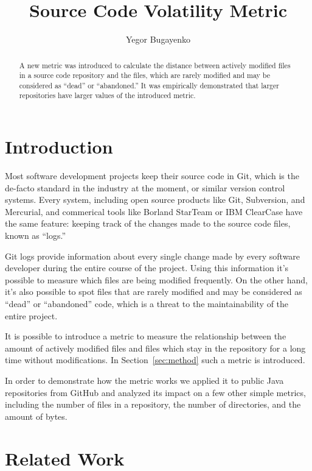 \documentclass[12pt]{article}
\title{Source Code Volatility Metric}
\author{Yegor Bugayenko}{}{}
\begin{document}
\raggedbottom
\maketitle

\begin{abstract}
A new metric was introduced to calculate the distance
between actively modified files in a source code repository
and the files, which are rarely modified and may be considered
as ``dead'' or ``abandoned.'' It was empirically demonstrated that larger repositories
have larger values of the introduced metric.
\end{abstract}

\section{Introduction}

Most software development projects keep their source code in Git,
which is the de-facto standard in the industry at the moment, or similar
version control systems. Every system, including open
source products like Git, Subversion, and Mercurial, and commerical tools
like Borland StarTeam\texttrademark{} or IBM ClearCase\texttrademark{}
have the same feature: keeping track of the changes
made to the source code files, known as ``logs.''

Git logs provide information about every single change made by every software
developer during the entire course of the project. Using this information
it's possible to measure which files are being modified frequently. On the
other hand, it's also possible to spot files that are rarely modified and may
be considered as ``dead'' or ``abandoned'' code, which is a threat
to the maintainability of the entire project.

It is possible to introduce a metric to measure the relationship
between the amount of actively modified files and files which stay
in the repository for a long time without modifications.
In Section~\ref{sec:method} such a metric is introduced.

In order to demonstrate how the metric works we applied it to
\thetotalrepos{} public Java repositories from GitHub and analyzed
its impact on a few other simple metrics, including the number
of files in a repository, the number of directories, and the amount
of bytes.

\section{Related Work}
\end{document}
